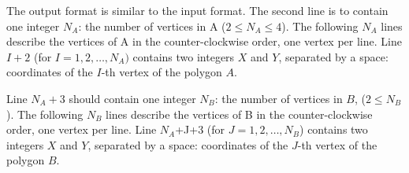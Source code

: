 The output format is similar to the input format. The second line is to contain one integer $N_A$: the number of vertices in A ($2 \le N_A \le 4$). The following $N_A$ lines describe the vertices of A in the counter-clockwise order, one vertex per line. Line $I+2$ (for $I = 1, 2, \ldots, N_A)$ contains two integers $X$ and $Y$, separated by a space: coordinates of the $I$-th vertex of the polygon $A$. 

Line $N_A+3$ should contain one integer $N_B$: the number of vertices in $B$, ($2 \le N_B$). The following $N_B$ lines describe the vertices of B in the counter-clockwise order, one vertex per line. Line $N_A$+J+3 (for $J = 1, 2, \ldots, N_B$) contains two integers $X$ and $Y$, separated by a space: coordinates of the $J$-th vertex of the polygon $B$. 